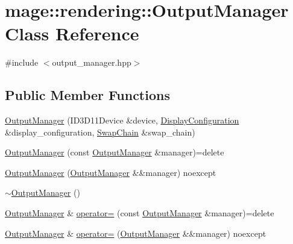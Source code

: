 \hypertarget{classmage_1_1rendering_1_1_output_manager}{}\section{mage\+:\+:rendering\+:\+:Output\+Manager Class Reference}
\label{classmage_1_1rendering_1_1_output_manager}


{\ttfamily \#include $<$output\+\_\+manager.\+hpp$>$}

\subsection*{Public Member Functions}
\begin{DoxyCompactItemize}
\item 
\mbox{\hyperlink{classmage_1_1rendering_1_1_output_manager_a02c97a57bf7217ab65ff5e7a44602200}{Output\+Manager}} (I\+D3\+D11\+Device \&device, \mbox{\hyperlink{classmage_1_1rendering_1_1_display_configuration}{Display\+Configuration}} \&display\+\_\+configuration, \mbox{\hyperlink{classmage_1_1rendering_1_1_swap_chain}{Swap\+Chain}} \&swap\+\_\+chain)
\item 
\mbox{\hyperlink{classmage_1_1rendering_1_1_output_manager_ae53a8cdec43d7c19dfb0c107814f228b}{Output\+Manager}} (const \mbox{\hyperlink{classmage_1_1rendering_1_1_output_manager}{Output\+Manager}} \&manager)=delete
\item 
\mbox{\hyperlink{classmage_1_1rendering_1_1_output_manager_aeafc4fb1d7a1904776f738b711635832}{Output\+Manager}} (\mbox{\hyperlink{classmage_1_1rendering_1_1_output_manager}{Output\+Manager}} \&\&manager) noexcept
\item 
\mbox{\hyperlink{classmage_1_1rendering_1_1_output_manager_ad2a02128a123be93391c8058ef2b3a0b}{$\sim$\+Output\+Manager}} ()
\item 
\mbox{\hyperlink{classmage_1_1rendering_1_1_output_manager}{Output\+Manager}} \& \mbox{\hyperlink{classmage_1_1rendering_1_1_output_manager_a7fb15ee3d3e3f7be648071ef1c6f3c6d}{operator=}} (const \mbox{\hyperlink{classmage_1_1rendering_1_1_output_manager}{Output\+Manager}} \&manager)=delete
\item 
\mbox{\hyperlink{classmage_1_1rendering_1_1_output_manager}{Output\+Manager}} \& \mbox{\hyperlink{classmage_1_1rendering_1_1_output_manager_a97d2c2be4389a615eb084dd53af531aa}{operator=}} (\mbox{\hyperlink{classmage_1_1rendering_1_1_output_manager}{Output\+Manager}} \&\&manager) noexcept
\item 

\end{DoxyCompactItemize}
